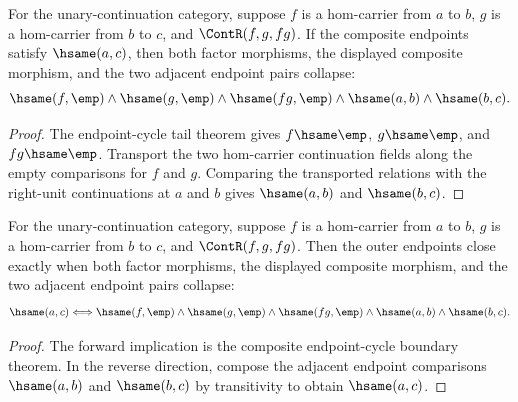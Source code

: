 \begin{theorem}
\label{thm:category-hom-carrier-comp-endpoint-cycle-boundary}
For the unary-continuation category, suppose $f$ is a hom-carrier from $a$ to
$b$, $g$ is a hom-carrier from $b$ to $c$, and $\ContR(f,g,fg)$. If the
composite endpoints satisfy $\hsame(a,c)$, then both factor morphisms, the
displayed composite morphism, and the two adjacent endpoint pairs collapse:
$$
\hsame(f,\emp)\land\hsame(g,\emp)\land\hsame(fg,\emp)\land
\hsame(a,b)\land\hsame(b,c).
$$
\end{theorem}
\begin{proof}
The endpoint-cycle tail theorem gives $f\hsame\emp$, $g\hsame\emp$, and
$fg\hsame\emp$. Transport the two hom-carrier continuation fields along the
empty comparisons for $f$ and $g$. Comparing the transported relations with
the right-unit continuations at $a$ and $b$ gives $\hsame(a,b)$ and
$\hsame(b,c)$.
\end{proof}

\begin{theorem}
\label{thm:category-hom-carrier-comp-endpoint-cycle-boundary-iff}
For the unary-continuation category, suppose $f$ is a hom-carrier from $a$ to
$b$, $g$ is a hom-carrier from $b$ to $c$, and $\ContR(f,g,fg)$. Then the
outer endpoints close exactly when both factor morphisms, the displayed
composite morphism, and the two adjacent endpoint pairs collapse:
$$
\hsame(a,c)\Longleftrightarrow
\hsame(f,\emp)\land\hsame(g,\emp)\land\hsame(fg,\emp)\land
\hsame(a,b)\land\hsame(b,c).
$$
\end{theorem}
\begin{proof}
The forward implication is the composite endpoint-cycle boundary theorem. In
the reverse direction, compose the adjacent endpoint comparisons
$\hsame(a,b)$ and $\hsame(b,c)$ by transitivity to obtain $\hsame(a,c)$.
\end{proof}

